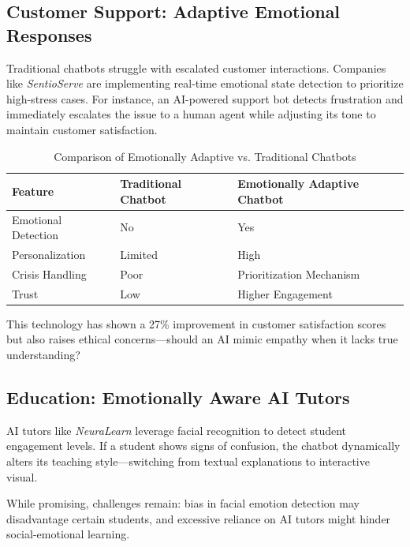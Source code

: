 \documentclass[a4paper,10pt]{article}
\begin{document}
\subsection{Customer Support: Adaptive Emotional Responses}
Traditional chatbots struggle with escalated customer interactions. Companies like \textit{SentioServe} are implementing real-time emotional state detection to prioritize high-stress cases. For instance, an AI-powered support bot detects frustration and immediately escalates the issue to a human agent while adjusting its tone to maintain customer satisfaction.

\begin{table}[h]
    \centering
    \caption{Comparison of Emotionally Adaptive vs. Traditional Chatbots}
    \renewcommand{\arraystretch}{1.2}
    \begin{tabular}{|p{4cm}|p{4cm}|p{4cm}|}
        \hline
        \textbf{Feature} & \textbf{Traditional Chatbot} & \textbf{Emotionally Adaptive Chatbot} \\
        \hline
        Emotional Detection & No & Yes \\
        \hline
        Personalization & Limited & High \\
        \hline
        Crisis Handling & Poor & Prioritization Mechanism \\
        \hline
        Trust & Low & Higher Engagement \\
        \hline
    \end{tabular}
    \label{tab:chatbot_comparison}
\end{table}

This technology has shown a 27\% improvement in customer satisfaction scores but also raises ethical concerns—should an AI mimic empathy when it lacks true understanding?



\subsection{Education: Emotionally Aware AI Tutors}
AI tutors like \textit{NeuraLearn} leverage facial recognition to detect student engagement levels. If a student shows signs of confusion, the chatbot dynamically alters its teaching style—switching from textual explanations to interactive visual.



While promising, challenges remain: bias in facial emotion detection may disadvantage certain students, and excessive reliance on AI tutors might hinder social-emotional learning.
\end{document}
